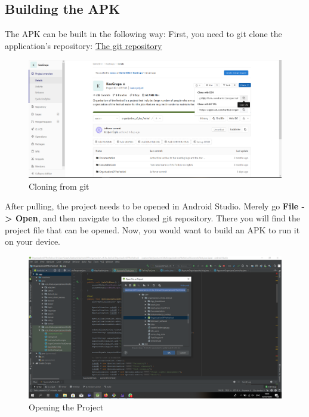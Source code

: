 			\subsection{Building the APK}
			
			The APK can be built in the following way:
			First, you need to git clone the application's repository: \href{https://gitlab.com/barbil/organization_of_the_festival}{The git repository}
			
			\begin{figure}[H]
				\includegraphics[width=\linewidth]{images/Deploy_M_1.png}
				\caption{Cloning from git}
				\label{fig:install_1}
			\end{figure}
			
			After pulling, the project needs to be opened in Android Studio. Merely go \textbf{File -> Open}, and then navigate to the cloned git repository. There you will find the project file that can be opened. Now, you would want to build an APK to run it on your device.
			
			\begin{figure}[H]
				\includegraphics[width=\linewidth]{images/Deploy_M_2.png}
				\caption{Opening the Project}
				\label{fig:install_2}
			\end{figure}
			
